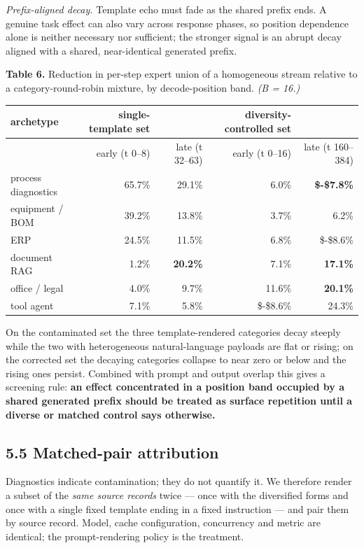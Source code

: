 \documentclass[
  10pt,
  letterpaper,
  10pt]{article}
\newcounter{none} %
\begin{document}
\emph{Prefix-aligned decay.} Template echo must fade as the shared
prefix ends. A genuine task effect can also vary across response phases,
so position dependence alone is neither necessary nor sufficient; the
stronger signal is an abrupt decay aligned with a shared, near-identical
generated prefix.

\textbf{Table 6.} Reduction in per-step expert union of a homogeneous
stream relative to a category-round-robin mixture, by decode-position
band. \emph{(B = 16.)}

{\def\LTcaptype{none} %
\begin{longtable}[]{@{}lrrrr@{}}
\toprule\noalign{}
archetype & single-template set & & diversity-controlled set & \\
\midrule\noalign{}
\endhead
\bottomrule\noalign{}
\endlastfoot
& early (t 0--8) & late (t 32--63) & early (t 0--16) & late (t
160--384) \\
process diagnostics & 65.7\% & 29.1\% & 6.0\% & \textbf{\$-\$7.8\%} \\
equipment / BOM & 39.2\% & 13.8\% & 3.7\% & 6.2\% \\
ERP & 24.5\% & 11.5\% & 6.8\% & \$-\$8.6\% \\
document RAG & 1.2\% & \textbf{20.2\%} & 7.1\% & \textbf{17.1\%} \\
office / legal & 4.0\% & 9.7\% & 11.6\% & \textbf{20.1\%} \\
tool agent & 7.1\% & 5.8\% & \$-\$8.6\% & 24.3\% \\
\end{longtable}
}

On the contaminated set the three template-rendered categories decay
steeply while the two with heterogeneous natural-language payloads are
flat or rising; on the corrected set the decaying categories collapse to
near zero or below and the rising ones persist. Combined with prompt and
output overlap this gives a screening rule: \textbf{an effect
concentrated in a position band occupied by a shared generated prefix
should be treated as surface repetition until a diverse or matched
control says otherwise.}

\subsection{5.5 Matched-pair
attribution}\label{matched-pair-attribution}

Diagnostics indicate contamination; they do not quantify it. We
therefore render a subset of the \emph{same source records} twice ---
once with the diversified forms and once with a single fixed template
ending in a fixed instruction --- and pair them by source record. Model,
cache configuration, concurrency and metric are identical; the
prompt-rendering policy is the treatment.
\end{document}
